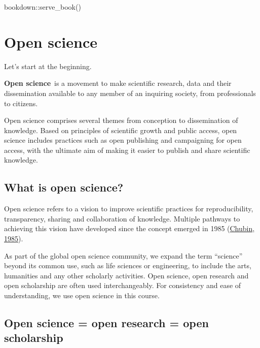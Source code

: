\documentclass[
]{book}
\newenvironment{Shaded}{\begin{snugshade}}{\end{snugshade}}
\newcommand{\FunctionTok}[1]{\textcolor[rgb]{0.00,0.00,0.00}{#1}}
\newcommand{\NormalTok}[1]{#1}
\newcommand{\SpecialCharTok}[1]{\textcolor[rgb]{0.00,0.00,0.00}{#1}}
\begin{document}
\begin{Shaded}
\begin{Highlighting}[]
\NormalTok{bookdown}\SpecialCharTok{::}\FunctionTok{serve\_book}\NormalTok{()}
\end{Highlighting}
\end{Shaded}

\hypertarget{open-science}{%
\chapter{Open science}\label{open-science}}

Let's start at the beginning.

\textbf{Open science}~is a movement to make scientific research, data and their dissemination available to any member of an inquiring society, from professionals to citizens.

Open science comprises several themes from conception to dissemination of knowledge. Based on principles of scientific growth and public access, open science includes practices such as open publishing and campaigning for open access, with the ultimate aim of making it easier to publish and share scientific knowledge.

\hypertarget{what-is-open-science}{%
\section{What is open science?}\label{what-is-open-science}}

Open science refers to a vision to improve scientific practices for reproducibility, transparency, sharing and collaboration of knowledge. Multiple pathways to achieving this vision have developed since the concept emerged in 1985 (\href{https://journals.sagepub.com/doi/10.1177/016224398501000211}{Chubin, 1985}).

As part of the global open science community, we expand the term ``science'' beyond its common use, such as life sciences or engineering, to include the arts, humanities and any other scholarly activities. Open science, open research and open scholarship are often used interchangeably. For consistency and ease of understanding, we use open science in this course.

\hypertarget{open-science-open-research-open-scholarship}{%
\section{Open science = open research = open scholarship}\label{open-science-open-research-open-scholarship}}
\end{document}
